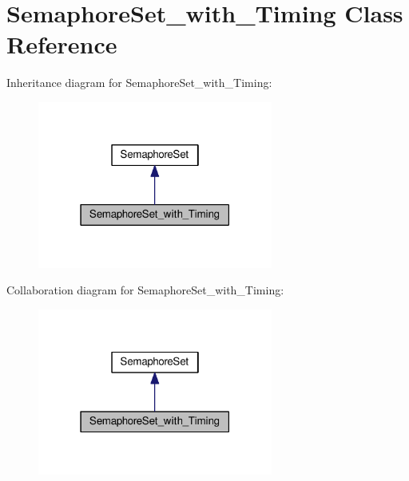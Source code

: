\hypertarget{classSemaphoreSet__with__Timing}{}\section{Semaphore\+Set\+\_\+with\+\_\+\+Timing Class Reference}
\label{classSemaphoreSet__with__Timing}


Inheritance diagram for Semaphore\+Set\+\_\+with\+\_\+\+Timing\+:
\nopagebreak
\begin{figure}[H]
\begin{center}
\leavevmode
\includegraphics[width=219pt]{classSemaphoreSet__with__Timing__inherit__graph}
\end{center}
\end{figure}


Collaboration diagram for Semaphore\+Set\+\_\+with\+\_\+\+Timing\+:
\nopagebreak
\begin{figure}[H]
\begin{center}
\leavevmode
\includegraphics[width=219pt]{classSemaphoreSet__with__Timing__coll__graph}
\end{center}
\end{figure}
